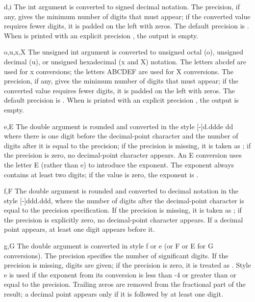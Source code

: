 \begin{DoxyItemize}
\item {\ttfamily d,i} The int argument is converted to signed decimal notation. The precision, if any, gives the minimum number of digits that must appear; if the converted value requires fewer digits, it is padded on the left with zeros. The default precision is {}. When {} is printed with an explicit precision {}, the output is empty.  
\item {\ttfamily o,u,x,X} The unsigned int argument is converted to unsigned octal ({\ttfamily o}), unsigned decimal ({\ttfamily u}), or unsigned hexadecimal ({\ttfamily x} and {\ttfamily X}) notation. The letters {\ttfamily abcdef} are used for {\ttfamily x} conversions; the letters {\ttfamily A\-B\-C\-D\-E\-F} are used for {\ttfamily X} conversions. The precision, if any, gives the minimum number of digits that must appear; if the converted value requires fewer digits, it is padded on the left with zeros. The default precision is {}. When {} is printed with an explicit precision {}, the output is empty.  
\item {\ttfamily e,E} The double argument is rounded and converted in the style {\ttfamily \mbox{[}-\/\mbox{]}d.\-ddde dd} where there is one digit before the decimal-\/point character and the number of digits after it is equal to the precision; if the precision is missing, it is taken as {}; if the precision is zero, no decimal-\/point character appears. An {\ttfamily E} conversion uses the letter {\ttfamily E} (rather than {\ttfamily e}) to introduce the exponent. The exponent always contains at least two digits; if the value is zero, the exponent is {}.  
\item {\ttfamily f,F} The double argument is rounded and converted to decimal notation in the style {\ttfamily \mbox{[}-\/\mbox{]}ddd.\-ddd}, where the number of digits after the decimal-\/point character is equal to the precision specification. If the precision is missing, it is taken as {}; if the precision is explicitly zero, no decimal-\/point character appears. If a decimal point appears, at least one digit appears before it.  
\item {\ttfamily g,G} The double argument is converted in style {\ttfamily f} or {\ttfamily e} (or {\ttfamily F} or {\ttfamily E} for {\ttfamily G} conversions). The precision specifies the number of significant digits. If the precision is missing, {} digits are given; if the precision is zero, it is treated as {}. Style e is used if the exponent from its conversion is less than {\ttfamily -\/4} or greater than or equal to the precision. Trailing zeros are removed from the fractional part of the result; a decimal point appears only if it is followed by at least one digit.  

\end{DoxyItemize}

